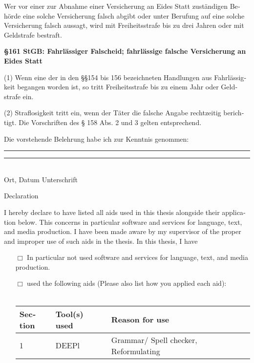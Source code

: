 \begin{otherlanguage}{ngerman}
\noindent Wer vor einer zur Abnahme einer Versicherung an Eides Statt zuständigen Behörde eine solche Versicherung
falsch abgibt oder unter Berufung auf eine solche Versicherung falsch aussagt, wird mit Freiheitsstrafe bis zu drei
Jahren oder mit Geldstrafe bestraft.

\textbf{\S 161 StGB: Fahrlässiger Falscheid; fahrlässige falsche Versicherung an Eides Statt}

\noindent(1) Wenn eine der in den \S\S 154 bis 156 bezeichneten Handlungen aus Fahrlässigkeit begangen worden ist, so tritt Freiheitsstrafe bis zu einem Jahr oder Geldstrafe ein.

\noindent (2) Straflosigkeit tritt ein, wenn der Täter die falsche Angabe rechtzeitig berichtigt. Die Vorschriften des § 158 Abs. 2 und 3 gelten entsprechend.

\noindent Die vorstehende Belehrung habe ich zur Kenntnis genommen:\vspace{0.6cm}\\
\noindent\rule[1ex]{30ex}{1pt} \hspace{15ex} \rule[1ex]{30ex}{1pt}\vspace{-0.2cm}\\
\phantom{}\hspace{6ex} Ort, Datum  \hspace{37.5ex} Unterschrift \vspace{0.1cm}\newpage

\begin{center} {\LARGE Declaration} \end{center}

I hereby declare to have listed all aids used in this thesis alongside their application below. This concerns in particular software and services for language, text, and media production. 
I have been made aware by my supervisor of the proper and improper use of such aids in the thesis.\newline
In this thesis, I have
\begin{itemize}
	\item[$\Box$] In particular not used software and services for language, text, and media production. 
	\item[$\Box$] 
	used the following aids (Please also list how you applied each aid):\\\\


\centering
\begin{tabular}{lll} 
\toprule
Section & Tool(s) used & Reason for use  \\
\midrule
1       & DEEPl        & Grammar/ Spell checker, Reformulating            \\
            

\end{tabular}
\end{itemize}
\end{otherlanguage}
